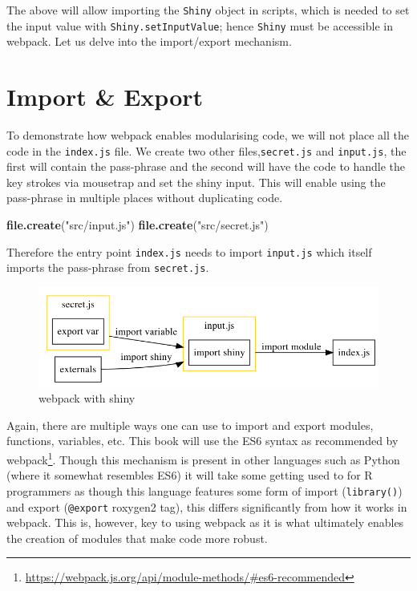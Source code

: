 \documentclass[
  10pt,
]{krantz}
\makeatletter
\newenvironment{Shaded}{\begin{snugshade}}{\end{snugshade}}
\newcommand{\KeywordTok}[1]{\textcolor[rgb]{0.27,0.27,0.27}{\textbf{#1}}}
\newcommand{\NormalTok}[1]{#1}
\newcommand{\StringTok}[1]{\textcolor[rgb]{0.5,0.5,0.5}{#1}}
\renewcommand{\href}[2]{#2\footnote{\url{#1}}}
\newenvironment{kframe}{%
\medskip{}
\setlength{\fboxsep}{.8em}
 \def\at@end@of@kframe{}%
 \ifinner\ifhmode%
  \def\at@end@of@kframe{\end{minipage}}%
  \begin{minipage}{\columnwidth}%
 \fi\fi%
 \def\FrameCommand##1{\hskip\@totalleftmargin \hskip-\fboxsep
 \colorbox{shadecolor}{##1}\hskip-\fboxsep
     \hskip-\linewidth \hskip-\@totalleftmargin \hskip\columnwidth}%
 \MakeFramed {\advance\hsize-\width
   \@totalleftmargin\z@ \linewidth\hsize
   \@setminipage}}%
 {\par\unskip\endMakeFramed%
 \at@end@of@kframe}
\renewenvironment{Shaded}{\begin{kframe}}{\end{kframe}}
\makeatother
\begin{document}
The above will allow importing the \texttt{Shiny} object in scripts, which is needed to set the input value with \texttt{Shiny.setInputValue}; hence \texttt{Shiny} must be accessible in webpack. Let us delve into the import/export mechanism.

\hypertarget{webpack-intro-import-export}{%
\section{Import \& Export}\label{webpack-intro-import-export}}

To demonstrate how webpack enables modularising code, we will not place all the code in the \texttt{index.js} file. We create two other files,\texttt{secret.js} and \texttt{input.js}, the first will contain the pass-phrase and the second will have the code to handle the key strokes via mousetrap and set the shiny input. This will enable using the pass-phrase in multiple places without duplicating code.

\begin{Shaded}
\begin{Highlighting}[]
\KeywordTok{file.create}\NormalTok{(}\StringTok{"src/input.js"}\NormalTok{)}
\KeywordTok{file.create}\NormalTok{(}\StringTok{"src/secret.js"}\NormalTok{)}
\end{Highlighting}
\end{Shaded}

Therefore the entry point \texttt{index.js} needs to import \texttt{input.js} which itself imports the pass-phrase from \texttt{secret.js}.

\begin{figure}[H]

{\centering \includegraphics[width=1\linewidth]{images/07-webpack-shiny} 

}

\caption{webpack with shiny}\label{fig:webpack-shiny}
\end{figure}

Again, there are multiple ways one can use to import and export modules, functions, variables, etc. This book will use the ES6 syntax as \href{https://webpack.js.org/api/module-methods/\#es6-recommended}{recommended by webpack}. Though this mechanism is present in other languages such as Python (where it somewhat resembles ES6) it will take some getting used to for R programmers as though this language features some form of import (\texttt{library()}) and export (\texttt{@export} roxygen2 tag), this differs significantly from how it works in webpack. This is, however, key to using webpack as it is what ultimately enables the creation of modules that make code more robust.
\end{document}
